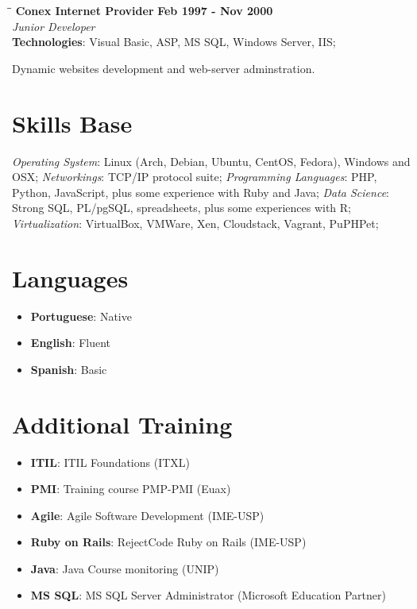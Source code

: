 \documentclass[margin]{res}
\begin{document}
\begin{resume}
   \begin{tabbing}
   \hspace{2.3in}\= \hspace{1.7in}\= \kill %
    \textbf{Conex Internet Provider}    \>\>\textbf{Feb 1997 - Nov 2000}\\
    \textit{Junior Developer}\\        
    \textbf{Technologies}: Visual Basic, ASP, MS SQL, Windows Server, IIS;
   \end{tabbing}\vspace{-20pt}      %
    \vspace{2mm}
      Dynamic websites development and web-server adminstration.  

\section{Skills Base}  

  \textit{Operating System}:  Linux (Arch, Debian, Ubuntu, CentOS, Fedora), Windows and OSX;
  \textit{Networkings}: TCP/IP protocol suite;
  \textit{Programming Languages}: PHP, Python, JavaScript, plus some experience with Ruby and Java;
  \textit{Data Science}: Strong SQL, PL/pgSQL, spreadsheets, plus some experiences with R;
  \textit{Virtualization}: VirtualBox, VMWare, Xen, Cloudstack, Vagrant, PuPHPet;

\section{Languages} 
  \begin{itemize}
    \vspace{2mm}
      \item \textbf{Portuguese}: Native
      \item \textbf{English}: Fluent
      \item \textbf{Spanish}: Basic
  \end{itemize}      

\section{Additional Training}
  \begin{itemize}
    \vspace{2mm}
      \item \textbf{ITIL}: ITIL Foundations (ITXL)
      \item \textbf{PMI}: Training course PMP-PMI (Euax)
      \item \textbf{Agile}: Agile Software Development (IME-USP)
      \item \textbf{Ruby on Rails}: RejectCode Ruby on Rails (IME-USP)
      \item \textbf{Java}: Java Course monitoring (UNIP)
      \item \textbf{MS SQL}: MS SQL Server Administrator (Microsoft Education Partner)
  \end{itemize}      
  

\end{resume}
\end{document}
